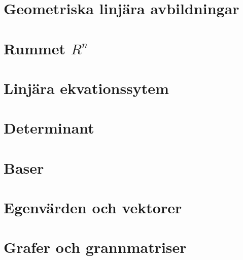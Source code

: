 \documentclass{article}
\begin{document}
    \section{Geometriska linjära avbildningar}
    \section{Rummet $R^n$}
    \section{Linjära ekvationssytem}
    \section{Determinant}
    \section{Baser}
    \section{Egenvärden och vektorer}
    \section{Grafer och grannmatriser}
\end{document}
